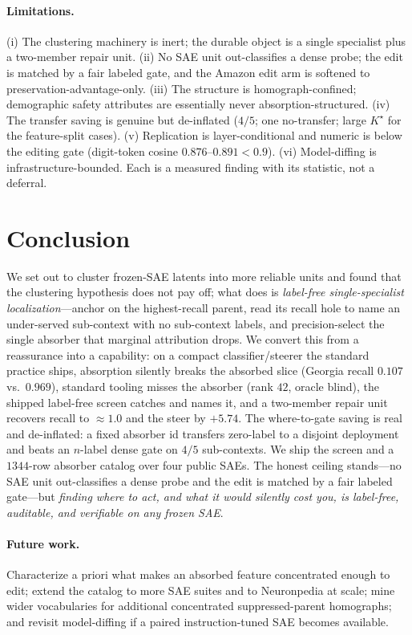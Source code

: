 \documentclass[11pt,letterpaper]{article}
\begin{document}
\paragraph{Limitations.} (i) The clustering machinery is inert; the durable object is a single specialist plus a two-member repair unit. (ii) No SAE unit out-classifies a dense probe; the edit is matched by a fair labeled gate, and the Amazon edit arm is softened to preservation-advantage-only. (iii) The structure is homograph-confined; demographic safety attributes are essentially never absorption-structured. (iv) The transfer saving is genuine but de-inflated ($4/5$; one no-transfer; large $K^\star$ for the feature-split cases). (v) Replication is layer-conditional and numeric is below the editing gate (digit-token cosine $0.876$--$0.891<0.9$). (vi) Model-diffing is infrastructure-bounded. Each is a measured finding with its statistic, not a deferral.

\section{Conclusion}
\label{sec:conclusion}

We set out to cluster frozen-SAE latents into more reliable units and found that the clustering hypothesis does not pay off; what does is \emph{label-free single-specialist localization}---anchor on the highest-recall parent, read its recall hole to name an under-served sub-context with no sub-context labels, and precision-select the single absorber that marginal attribution drops. We convert this from a reassurance into a capability: on a compact classifier/steerer the standard practice ships, absorption silently breaks the absorbed slice (Georgia recall $0.107$ vs.\ $0.969$), standard tooling misses the absorber (rank $42$, oracle blind), the shipped label-free screen catches and names it, and a two-member repair unit recovers recall to $\approx1.0$ and the steer by $+5.74$. The where-to-gate saving is real and de-inflated: a fixed absorber id transfers zero-label to a disjoint deployment and beats an $n$-label dense gate on $4/5$ sub-contexts. We ship the screen and a $1344$-row absorber catalog over four public SAEs. The honest ceiling stands---no SAE unit out-classifies a dense probe and the edit is matched by a fair labeled gate---but \emph{finding where to act, and what it would silently cost you, is label-free, auditable, and verifiable on any frozen SAE}.

\paragraph{Future work.} Characterize a priori what makes an absorbed feature concentrated enough to edit; extend the catalog to more SAE suites and to Neuronpedia at scale; mine wider vocabularies for additional concentrated suppressed-parent homographs; and revisit model-diffing if a paired instruction-tuned SAE becomes available.
\end{document}
